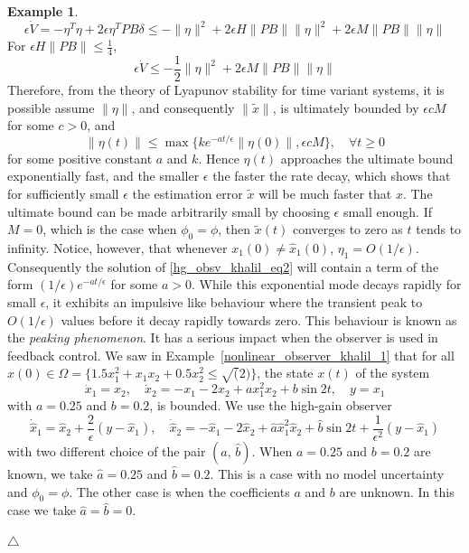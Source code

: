 \documentclass[11pt,a4paper,oneside]{book}
\numberwithin{equation}{section}
\theoremstyle{it}
\theoremstyle{definition}
\newtheorem{example}{Example}[section]
\begin{document}
\begin{example}
\begin{equation*}
		\epsilon\dot{V}=-\eta^T\eta+2\epsilon\eta^TPB\delta\le-\|\eta\|^2+2\epsilon H\|PB\|\|\eta\|^2+2\epsilon M \|PB\|\|\eta\|
	\end{equation*}
	For $\epsilon H\|PB\|\le\frac{1}{4}$,
	\begin{equation*}
		\epsilon\dot{V}\le-\frac{1}{2}\|\eta\|^2+2\epsilon M\|PB\|\|\eta\|
	\end{equation*} 
	Therefore, from the theory of Lyapunov stability for time variant systems, it is possible assume $\|\eta\|$, and consequently $\|\tilde{x}\|$, is ultimately bounded by $\epsilon c M$ for some $c>0$, and
	\begin{equation*}
		\|\eta(t)\| \le \max \Big\{ke^{-at/\epsilon}\|\eta(0)\|,\epsilon c M\Big\},\quad \forall t\ge 0
	\end{equation*}
	for some positive constant $a$ and $k$. Hence $\eta(t)$ approaches the ultimate bound exponentially fast, and the smaller $\epsilon$ the faster the rate decay, which shows that for sufficiently small $\epsilon$ the estimation error $\tilde{x}$ will be much faster that $x$. The ultimate bound can be made arbitrarily small by choosing $\epsilon$ small enough. If $M=0$, which is the case when $\phi_0=\phi$, then $\tilde{x}(t)$ converges to zero as $t$ tends to infinity. Notice, however, that whenever $x_1(0)\ne\hat{x}_1(0)$, $\eta_1=O(1/\epsilon)$. Consequently the solution of \eqref{hg_obsv_khalil_eq2} will contain a term of the form $(1/\epsilon)e^{-at/\epsilon}$ for some $a>0$. While this exponential mode decays rapidly for small $\epsilon$, it exhibits an impulsive like behaviour where the transient peak to $O(1/\epsilon)$ values before it decay rapidly towards zero. This behaviour is known as the \textit{peaking phenomenon}. It has a serious impact when the observer is used in feedback control. We saw in Example~\ref{nonlinear_observer_khalil_1} that for all $x(0)\in \Omega=\big\{ 1.5x_1^2+x_1x_2+0.5x_2^2\le\sqrt(2)\big\}$, the state $x(t)$ of the system
	\begin{equation*}
		\dot{x}_1=x_2,\quad\dot{x}_2=-x_1-2x_2+ax_1^2x_2+b\sin2t,\quad y=x_1
	\end{equation*} 
	with $a=0.25$ and $b=0.2$, is bounded. We use the high-gain observer
	\begin{equation*}
		\dot{\hat{x}}_1=\hat{x}_2+\frac{2}{\epsilon}(y-\hat{x}_1),\quad\dot{\hat{x}}_2=-\hat{x}_1-2\hat{x}_2+\hat{a}\hat{x}_1^2\hat{x}_2+\hat{b}\sin2t+\frac{1}{\epsilon^2}(y-\hat{x}_1)
	\end{equation*}
	with two different choice of the pair $(\hat{a},\,\hat{b})$. When $a=0.25$ and $b=0.2$ are known, we take $\hat{a}=0.25$ and $\hat{b}=0.2$. This is a case with no model uncertainty and $\phi_0=\phi$. The other case is when the coefficients $a$ and $b$ are unknown. In this case we take $\hat{a}=\hat{b}=0$.  
	
	
	
	
	\hfill$\triangle$
\end{example}
\end{document}

